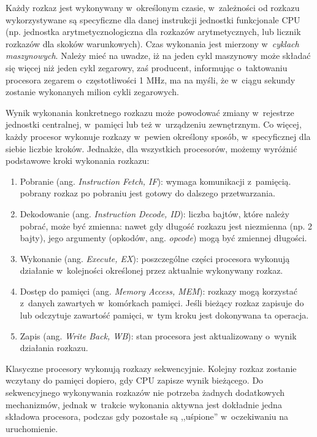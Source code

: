 \documentclass{mwart}
\begin{document}
	Każdy rozkaz jest wykonywany w~określonym czasie, w~zależności od rozkazu wykorzystywane są specyficzne dla danej instrukcji
	jednostki funkcjonale CPU (np. jednostka arytmetyczno\dywiz logiczna dla rozkazów arytmetycznych, lub licznik rozkazów
	dla skoków warunkowych). Czas wykonania jest mierzony w~\emph{cyklach maszynowych}. Należy mieć na uwadze, 
	iż na jeden cykl maszynowy może składać się więcej niż jeden cykl zegarowy, zaś
	producent, informując o~taktowaniu procesora zegarem o~częstotliwości 1 MHz, ma na myśli, że
	w~ciągu sekundy zostanie wykonanych milion cykli zegarowych.
\par
%
\indent
	Wynik wykonania konkretnego rozkazu może powodować zmiany w~rejestrze jednostki centralnej, w~pamięci lub
	też w~urządzeniu zewnętrznym. Co więcej, każdy procesor wykonuje rozkazy w~pewien określony sposób, w~specyficznej dla siebie liczbie kroków.
	Jednakże, dla wszystkich procesorów, możemy wyróżnić podstawowe kroki wykonania rozkazu:
	\begin{enumerate}
	\item Pobranie (ang. \emph{Instruction Fetch, IF}): wymaga komunikacji z~pamięcią.
		pobrany rozkaz po pobraniu jest gotowy do dalszego przetwarzania.
	\item Dekodowanie (ang. \emph{Instruction Decode, ID}):  liczba bajtów, które należy pobrać, może być zmienna:
		nawet gdy długość rozkazu jest niezmienna (np. 2 bajty), jego argumenty (opkodów, ang. \emph{opcode}) mogą być zmiennej długości.
	\item Wykonanie (ang. \emph{Execute, EX}): poszczególne części procesora wykonują działanie w~kolejności określonej przez aktualnie
		wykonywany rozkaz.
	\item Dostęp do pamięci (ang. \emph{Memory Access, MEM}): rozkazy mogą korzystać z~danych zawartych w~komórkach pamięci. Jeśli bieżący rozkaz
		zapisuje do lub odczytuje zawartość pamięci, w~tym kroku jest dokonywana ta operacja.
	\item Zapis (ang. \emph{Write Back, WB}): stan procesora jest aktualizowany o~wynik działania rozkazu.
	\end{enumerate}
\par
%
\indent
	Klasyczne procesory wykonują rozkazy sekwencyjnie. Kolejny rozkaz zostanie wczytany do pamięci dopiero, gdy
	CPU zapisze wynik bieżącego. Do sekwencyjnego wykonywania rozkazów nie potrzeba żadnych dodatkowych mechanizmów,
	jednak w~trakcie wykonania aktywna jest dokładnie jedna składowa procesora, podczas gdy pozostałe są ,,uśpione''
	w~oczekiwaniu na uruchomienie.
\end{document}
